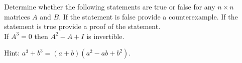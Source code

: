 
\begin{Exercise}[
name={},
title={}, 
difficulty=0,
origin={\cite{BS}}]
\end{Exercise}
Determine whether the following statements are true or false for any $n\times n$
matrices $A$ and $B$.  If the statement is false provide a counterexample. If the
statement is true provide a proof of the statement.\\

If $A^3=0$ then $A^2-A+I$ is invertible.
\begin{Answer}
Hint: $a^3+b^3=(a+b)(a^2-ab+b^2)$.
\end{Answer}
